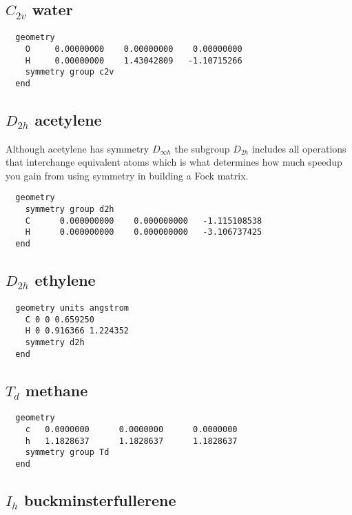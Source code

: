\label{symexamples}

  \subsection{\protect$C_{2v}$ water}

\begin{verbatim}
  geometry
    O     0.00000000    0.00000000    0.00000000
    H     0.00000000    1.43042809   -1.10715266
    symmetry group c2v
  end
\end{verbatim}

  \subsection{\protect$D_{2h}$ acetylene}

Although acetylene has symmetry $D_{\infty h}$ the subgroup
$D_{2h}$ includes all operations that interchange equivalent atoms
which is what determines how much speedup you gain from using symmetry
in building a Fock matrix.

\begin{verbatim}
  geometry
    symmetry group d2h
    C      0.000000000    0.000000000   -1.115108538
    H      0.000000000    0.000000000   -3.106737425
  end
\end{verbatim}

  \subsection{\protect$D_{2h}$ ethylene}

\begin{verbatim}
  geometry units angstrom
    C 0 0 0.659250 
    H 0 0.916366 1.224352 
    symmetry d2h
  end
\end{verbatim}


  \subsection{\protect$T_d$ methane}

\begin{verbatim}
  geometry
    c   0.0000000      0.0000000      0.0000000
    h   1.1828637      1.1828637      1.1828637
    symmetry group Td
  end
\end{verbatim}

  \subsection{\protect$I_h$ buckminsterfullerene}

